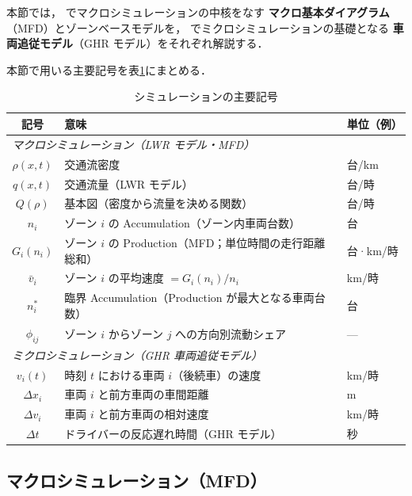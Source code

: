 本節では， でマクロシミュレーションの中核をなす
\textbf{マクロ基本ダイアグラム}（MFD）とゾーンベースモデルを，
 でミクロシミュレーションの基礎となる
\textbf{車両追従モデル}（GHR モデル）をそれぞれ解説する．

本節で用いる主要記号を表\ref{tab:ch8-notation}にまとめる．

\begin{table}[hbtp]
  \centering
  \caption{シミュレーションの主要記号}
  \label{tab:ch8-notation}
  \begin{tabular}{cll}
    \toprule
    記号 & 意味 & 単位（例） \\
    \midrule
    \multicolumn{3}{l}{\textit{マクロシミュレーション（LWR モデル・MFD）}} \\
    \midrule
    $\rho(x,t)$      & 交通流密度 & 台/km \\
    $q(x,t)$         & 交通流量（LWR モデル） & 台/時 \\
    $Q(\rho)$        & 基本図（密度から流量を決める関数） & 台/時 \\
    $n_i$            & ゾーン $i$ の Accumulation（ゾーン内車両台数） & 台 \\
    $G_i(n_i)$       & ゾーン $i$ の Production（MFD；単位時間の走行距離総和） & 台·km/時 \\
    $\bar{v}_i$      & ゾーン $i$ の平均速度 $= G_i(n_i)/n_i$ & km/時 \\
    $n_i^*$          & 臨界 Accumulation（Production が最大となる車両台数） & 台 \\
    $\phi_{ij}$      & ゾーン $i$ からゾーン $j$ への方向別流動シェア & — \\
    \midrule
    \multicolumn{3}{l}{\textit{ミクロシミュレーション（GHR 車両追従モデル）}} \\
    \midrule
    $v_i(t)$         & 時刻 $t$ における車両 $i$（後続車）の速度 & km/時 \\
    $\Delta x_i$     & 車両 $i$ と前方車両の車間距離 & m \\
    $\Delta v_i$     & 車両 $i$ と前方車両の相対速度 & km/時 \\
    $\Delta t$       & ドライバーの反応遅れ時間（GHR モデル） & 秒 \\
    \bottomrule
  \end{tabular}
\end{table}

\subsection{マクロシミュレーション（MFD）}
\label{subsec:mfd}

